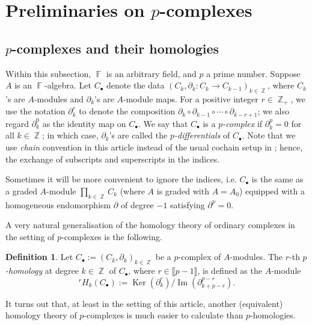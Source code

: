 \documentclass[a4paper]{amsart}
\numberwithin{equation}{subsection}
\theoremstyle{definition}
\newtheorem{definition}[theorem]{Definition}
\DeclareMathOperator{\F}{\mathbb{F}}
\DeclareMathOperator{\Z}{\mathbb{Z}}
\newcommand{\interval}[1]{\llbracket #1 \rrbracket}
\DeclareMathOperator{\Ker}{\mathrm{Ker}}
\DeclareMathOperator{\Image}{\mathrm{Im}}
\numberwithin{equation}{subsection}
\begin{document}
\section{Preliminaries on $p$-complexes}\label{sec: prelim}

\subsection{$p$-complexes and their homologies}\label{subsec:pcpx}
Within this subsection, $\F$ is an arbitrary field, and $p$ a prime number.
Suppose $A$ is an $\F$-algebra.
Let $C_\bullet$ denote the data $(C_k, \partial_k:C_k\to C_{k-1})_{k\in \Z}$, where $C_k$'s are $A$-modules and $\partial_k$'s are $A$-module maps.
For a positive integer $r\in\Z_+$, we use the notation $\partial_k^r$ to denote the composition $\partial_k\circ \partial_{k-1}\circ \cdots \circ \partial_{k-r+1}$; we also regard $\partial_k^0$ as the identity map on $C_\bullet$.
We say that $C_\bullet$ is a \emph{$p$-complex} if $\partial_{k}^p=0$ for all $k\in \Z$; in which case, $\partial_k$'s are called the \emph{$p$-differentials} of $C_\bullet$.
Note that we use \emph{chain} convention in this article instead of the usual cochain setup in \cite{KhQi}; hence, the exchange of subscripts and superscripts in the indices.

Sometimes it will be more convenient to ignore the indices, i.e. $C_\bullet$ is the same as a graded $A$-module $\prod_{k\in\Z} C_k$ (where $A$ is graded with $A=A_0$) equipped with a homogeneous endomorphism $\partial$ of degree $-1$ satisfying $\partial^p=0$.

A very natural generalisation of the homology theory of ordinary complexes in the setting of $p$-complexes is the following.
\begin{definition}
Let $C_\bullet:=(C_k,\partial_k)_{k\in\Z}$ be a $p$-complex of $A$-modules.
The $r$-th \emph{$p$-homology} at degree $k\in \Z$ of $C_\bullet$, where $r\in\interval{p-1}$, is defined as the  $A$-module
\[
{}^rH_k(C_\bullet) := \Ker(\partial_k^r) / \Image(\partial_{k+p-r}^{p-r}).
\]
\end{definition}

It turns out that, at least in the setting of this article,  another (equivalent) homology theory of $p$-complexes is much easier to calculate than $p$-homologies.
\end{document}
